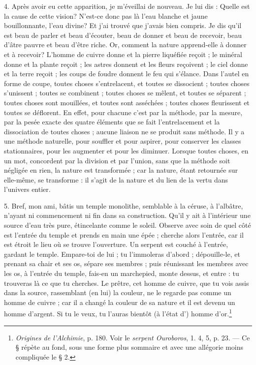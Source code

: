 \documentclass[landscape, a4paper, 11pt, oneside, polutonikogreek, french]{article}
\begin{document}
4. Après avoir eu cette apparition, je m'éveillai de nouveau. Je lui dis : Quelle est la cause de cette vision? N'est-ce donc pas là l'eau blanche et jaune bouillonnante, l'eau divine? Et j'ai trouvé que j'avais bien compris. Je dis qu'il est beau de parler et beau d'écouter, beau de donner et beau de recevoir, beau d'âtre pauvre et beau d'être riche. Or, comment la nature apprend-elle à donner et à recevoir? L'homme de cuivre donne et la pierre liquéfiée reçoit ; le minéral donne et la plante reçoit ; les astres donnent et les fleurs reçoivent ; le ciel donne et la terre reçoit ; les coups de foudre donnent le feu qui s'élance. Dans l'autel en forme de coupe, toutes choses s'entrelacent, et toutes se dissocient ; toutes choses s'unissent ; toutes se combinent ; toutes choses se mêlent, et toutes se séparent ; toutes choses sont mouillées, et toutes sont asséchées ; toutes choses fleurissent et toutes se déflorent. En effet, pour chacune c'est par la méthode, par la mesure, par la pesée exacte des quatre éléments que se fait l'entrelacement et la dissociation de toutes choses ; aucune liaison ne se produit sans méthode. Il y a une méthode naturelle, pour souffler et pour aspirer, pour conserver les classes stationnaires, pour les augmenter et pour les diminuer. Lorsque toutes choses, en un mot, concordent par la division et par l'union, sans que la méthode soit négligée en rien, la nature est transformée ; car la nature, étant retournée sur elle-même, se transforme : il s'agit de la nature et du lien de la vertu dans l'univers entier.

5. Bref, mon ami, bâtis un temple monolithe, semblable à la céruse, à l'albâtre, n'ayant ni commencement ni fin dans sa construction. Qu'il y ait à l'intérieur une source d'eau très pure, étincelante comme le soleil. Observe avec soin de quel côté est l'entrée du temple et prends en main une épée ; cherche alors l'entrée, car il est étroit le lieu où se trouve l'ouverture. Un serpent est couché à l'entrée, gardant le temple. Empare-toi de lui ; tu l'immoleras d'abord ; dépouille-le, et prenant sa chair et ses os, sépare ses membres ; puis réunissant les membres avec les os, à l'entrée du temple, fais-en un marchepied, monte dessus, et entre : tu trouveras là ce que tu cherches. Le prêtre, cet homme de cuivre, que tu vois assis dans la source, rassemblant (en lui) la couleur, ne le regarde pas comme un homme de cuivre ; car il a changé la couleur de sa nature et il est devenu un homme d'argent. Si tu le veux, tu l'auras bientôt (à l'état d') homme d'or.\footnote{\emph{Origines de l'Alchimie}, p. 180. Voir le \emph{serpent Ouroboros}, 1. 4, 5, p. 23. --- Ce § répète au fond, sous une forme plus sommaire et avec une allégorie moins compliquée le § 2.}
\end{document}
